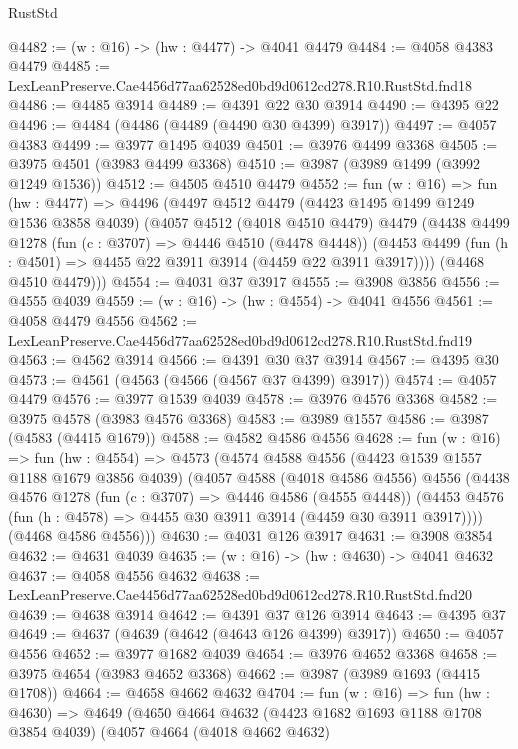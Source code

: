 \begin{lexlean}{RustStd}
\begin{coremodule}
@4482 := (w : @16) -> (hw : @4477) -> @4041 @4479
@4484 := @4058 @4383 @4479
@4485 := LexLeanPreserve.Cae4456d77aa62528ed0bd9d0612cd278.R10.RustStd.fnd18
@4486 := @4485 @3914
@4489 := @4391 @22 @30 @3914
@4490 := @4395 @22
@4496 := @4484 (@4486 (@4489 (@4490 @30 @4399) @3917))
@4497 := @4057 @4383
@4499 := @3977 @1495 @4039
@4501 := @3976 @4499 @3368
@4505 := @3975 @4501 (@3983 @4499 @3368)
@4510 := @3987 (@3989 @1499 (@3992 @1249 @1536))
@4512 := @4505 @4510 @4479
@4552 := fun (w : @16) =>
  fun (hw : @4477) =>
  @4496
    (@4497
      @4512
      @4479
      (@4423 @1495 @1499 @1249 @1536 @3858 @4039)
      (@4057
        @4512
        (@4018 @4510 @4479)
        @4479
        (@4438
          @4499
          @1278
          (fun (c : @3707) => @4446 @4510 (@4478 @4448))
          (@4453 @4499 (fun (h : @4501) => @4455 @22 @3911 @3914 (@4459 @22 @3911 @3917))))
        (@4468 @4510 @4479)))
@4554 := @4031 @37 @3917
@4555 := @3908 @3856
@4556 := @4555 @4039
@4559 := (w : @16) -> (hw : @4554) -> @4041 @4556
@4561 := @4058 @4479 @4556
@4562 := LexLeanPreserve.Cae4456d77aa62528ed0bd9d0612cd278.R10.RustStd.fnd19
@4563 := @4562 @3914
@4566 := @4391 @30 @37 @3914
@4567 := @4395 @30
@4573 := @4561 (@4563 (@4566 (@4567 @37 @4399) @3917))
@4574 := @4057 @4479
@4576 := @3977 @1539 @4039
@4578 := @3976 @4576 @3368
@4582 := @3975 @4578 (@3983 @4576 @3368)
@4583 := @3989 @1557
@4586 := @3987 (@4583 (@4415 @1679))
@4588 := @4582 @4586 @4556
@4628 := fun (w : @16) =>
  fun (hw : @4554) =>
  @4573
    (@4574
      @4588
      @4556
      (@4423 @1539 @1557 @1188 @1679 @3856 @4039)
      (@4057
        @4588
        (@4018 @4586 @4556)
        @4556
        (@4438
          @4576
          @1278
          (fun (c : @3707) => @4446 @4586 (@4555 @4448))
          (@4453 @4576 (fun (h : @4578) => @4455 @30 @3911 @3914 (@4459 @30 @3911 @3917))))
        (@4468 @4586 @4556)))
@4630 := @4031 @126 @3917
@4631 := @3908 @3854
@4632 := @4631 @4039
@4635 := (w : @16) -> (hw : @4630) -> @4041 @4632
@4637 := @4058 @4556 @4632
@4638 := LexLeanPreserve.Cae4456d77aa62528ed0bd9d0612cd278.R10.RustStd.fnd20
@4639 := @4638 @3914
@4642 := @4391 @37 @126 @3914
@4643 := @4395 @37
@4649 := @4637 (@4639 (@4642 (@4643 @126 @4399) @3917))
@4650 := @4057 @4556
@4652 := @3977 @1682 @4039
@4654 := @3976 @4652 @3368
@4658 := @3975 @4654 (@3983 @4652 @3368)
@4662 := @3987 (@3989 @1693 (@4415 @1708))
@4664 := @4658 @4662 @4632
@4704 := fun (w : @16) =>
  fun (hw : @4630) =>
  @4649
    (@4650
      @4664
      @4632
      (@4423 @1682 @1693 @1188 @1708 @3854 @4039)
      (@4057
        @4664
        (@4018 @4662 @4632)

\end{coremodule}
\end{lexlean}
